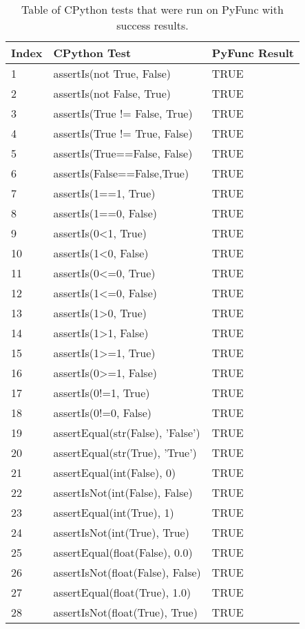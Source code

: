 \documentclass{l4proj}
\begin{document}
\begin{appendices}
\begin{table}[!ht]
    \centering
    \begin{tabular}{|l|l|l|}
    \hline
        Index & CPython Test  & PyFunc Result \\ \hline
        1 & assertIs(not True, False)  & TRUE \\ \hline
        2 & assertIs(not False, True)  & TRUE \\ \hline
        3 & assertIs(True != False, True)  & TRUE \\ \hline
        4 & assertIs(True != True, False)  & TRUE \\ \hline
        5 & assertIs(True==False, False)  & TRUE \\ \hline
        6 & assertIs(False==False,True)  & TRUE \\ \hline
        7 & assertIs(1==1, True)  & TRUE \\ \hline
        8 & assertIs(1==0, False)  & TRUE \\ \hline
        9 & assertIs(0<1, True)  & TRUE \\ \hline
        10 & assertIs(1<0, False)  & TRUE \\ \hline
        11 & assertIs(0<=0, True) & TRUE \\ \hline
        12 & assertIs(1<=0, False)  & TRUE \\ \hline
        13 & assertIs(1>0, True) & TRUE \\ \hline
        14 & assertIs(1>1, False)  & TRUE \\ \hline
        15 & assertIs(1>=1, True)  & TRUE \\ \hline
        16 & assertIs(0>=1, False)  & TRUE \\ \hline
        17 & assertIs(0!=1, True) & TRUE \\ \hline
        18 & assertIs(0!=0, False) & TRUE \\ \hline
        19 & assertEqual(str(False), 'False')  & TRUE \\ \hline
        20 & assertEqual(str(True), 'True')  & TRUE \\ \hline
        21 & assertEqual(int(False), 0)  & TRUE \\ \hline
        22 & assertIsNot(int(False), False)  & TRUE \\ \hline
        23 & assertEqual(int(True), 1)  & TRUE \\ \hline
        24 & assertIsNot(int(True), True)  & TRUE \\ \hline
        25 & assertEqual(float(False), 0.0)  & TRUE \\ \hline
        26 & assertIsNot(float(False), False)  & TRUE \\ \hline
        27 & assertEqual(float(True), 1.0)  & TRUE \\ \hline
        28 & assertIsNot(float(True), True) & TRUE \\ \hline
    \end{tabular}
    \caption{Table of CPython tests that were run on PyFunc with success results.}
    \label{tbl:eval-bools}
\end{table}


\end{appendices}
\end{document}
